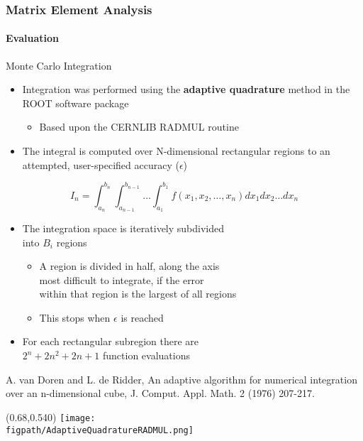 \begin{frame}
	\frametitle{Matrix Element Analysis}
	\framesubtitle{Evaluation}
	\vspace*{-0.24cm}
	\begin{block}{Monte Carlo Integration}
		\begin{itemize}
			\item Integration was performed using the \textbf{adaptive quadrature} method in the ROOT software package
			\begin{itemize}
				\item Based upon the CERNLIB RADMUL routine
			\end{itemize}
			\item The integral is computed over N-dimensional rectangular regions to an attempted, user-specified accuracy ($\epsilon$)
		\end{itemize}
		\begin{equation}
			I_{n}=\int_{a_{n}}^{b_{n}}\int_{a_{n-1}}^{b_{n-1}}\ldots\int_{a_{1}}^{b_{1}}f\left(x_{1},x_{2},\ldots,x_{n}\right)dx_{1}dx_{2}{\ldots}dx_{n}
		\end{equation}
		\vspace*{-0.40cm}
		\begin{itemize}
			\item The integration space is iteratively subdivided\\into $B_{i}$ regions
			\begin{itemize}
				\item A region is divided in half, along the axis\\most difficult to integrate, if the error\\within that region is the largest of all regions
				\item This stops when $\epsilon$ is reached
			\end{itemize}
			\item For each rectangular subregion there are\\$2^{n}+2n^{2}+2n+1$ function evaluations
		\end{itemize}
		\vspace*{-0.035cm}
		{\tiny A. van Doren and L. de Ridder, An adaptive algorithm for numerical integration over an n-dimensional cube, J. Comput. Appl. Math. 2 (1976) 207-217.}
	\end{block}
	\begin{textblock}{0.25}(0.68,0.540)
		\texttt{[image: \\figpath/AdaptiveQuadratureRADMUL.png]}
	\end{textblock}
\end{frame}

